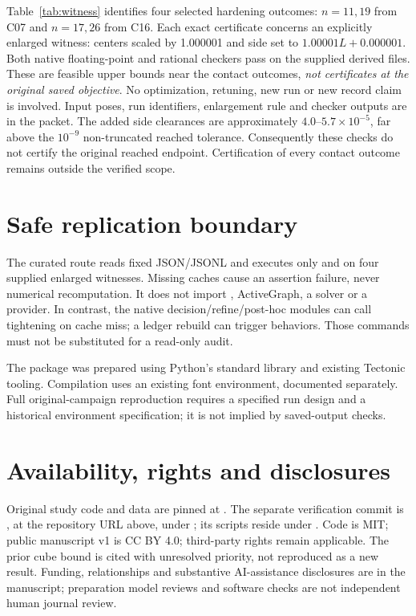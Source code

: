 \documentclass[11pt]{article}
\begin{document}
\begin{table}[ht]\centering\small\caption{Stored numerical objectives and separately enlarged bounds checked exactly.}\label{tab:witness}\end{table}\FloatBarrier
Table~\ref{tab:witness} identifies four selected hardening outcomes: $n=11,19$ from C07 and $n=17,26$ from C16. Each exact certificate concerns an explicitly enlarged witness: centers scaled by 1.000001 and side set to $1.00001L+0.000001$. Both native floating-point and rational checkers pass on the supplied derived files. These are feasible upper bounds near the contact outcomes, \emph{not certificates at the original saved objective}. No optimization, retuning, new run or new record claim is involved. Input poses, run identifiers, enlargement rule and checker outputs are in the packet. The added side clearances are approximately $4.0$--$5.7\times10^{-5}$, far above the $10^{-9}$ non-truncated reached tolerance. Consequently these checks do not certify the original reached endpoint. Certification of every contact outcome remains outside the verified scope.

\section{Safe replication boundary}
The curated route reads fixed JSON/JSONL and executes only  and  on four supplied enlarged witnesses. Missing caches cause an assertion failure, never numerical recomputation. It does not import , ActiveGraph, a solver or a provider. In contrast, the native decision/refine/post-hoc modules can call tightening on cache miss; a ledger rebuild can trigger behaviors. Those commands must not be substituted for a read-only audit.

The package was prepared using Python's standard library and existing Tectonic tooling. Compilation uses an existing font environment, documented separately. Full original-campaign reproduction requires a specified run design and a historical environment specification; it is not implied by saved-output checks.

\clearpage
\section{Availability, rights and disclosures}
Original study code and data are pinned at . The separate verification commit is , at the repository URL above, under ; its scripts reside under . Code is MIT; public manuscript v1 is CC BY 4.0; third-party rights remain applicable. The prior cube bound is cited with unresolved priority, not reproduced as a new result. Funding, relationships and substantive AI-assistance disclosures are in the manuscript; preparation model reviews and software checks are not independent human journal review.
\end{document}
